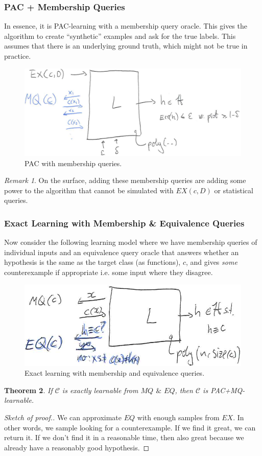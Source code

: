 \documentclass[12pt, letterpaper]{article}
\numberwithin{equation}{section} %
\newcommand{\mc}{\mathcal}
\newtheorem{theorem}{Theorem}[section]
\theoremstyle{definition}
\theoremstyle{remark}
\newtheorem{remark}[theorem]{Remark}
\begin{document}
\subsubsection*{PAC + Membership Queries}
In essence, it is PAC-learning with a membership query oracle. This gives the algorithm to create ``synthetic'' examples and ask for the true labels. This assumes that there is an underlying ground truth, which might not be true in practice.
\begin{figure}[H]
\centering
\includegraphics[width=0.6\linewidth]{../img/pac-mq.png}
\caption{PAC with membership queries.}
\end{figure}
\begin{remark}
On the surface, adding these membership queries are adding some power to the algorithm that cannot be simulated with $EX(c, D)$ or statistical queries.
\end{remark}
\subsubsection*{Exact Learning with Membership \& Equivalence Queries}
Now consider the following learning model where we have membership queries of individual inputs and an equivalence query oracle that answers whether an hypothesis is the same as the target class (as functions), $c$, and gives \emph{some} counterexample if appropriate i.e. some input where they disagree.
\begin{figure}[H]
\centering
\includegraphics[width=0.6\linewidth]{../img/pac-mq-eq.png}
\caption{Exact learning with membership and equivalence queries.}
\end{figure}

\begin{theorem}
If $\mc C$ is exactly learnable from $MQ$ $\&$ $EQ$, then $\mc C$ is PAC+MQ-learnable.
\end{theorem}
\begin{proof}[Sketch of proof.]
We can approximate $EQ$ with enough samples from $EX$. In other words, we sample looking for a counterexample. If we find it great, we can return it. If we don't find it in a reasonable time, then also great because we already have a reasonably good hypothesis.
\end{proof}
\end{document}

